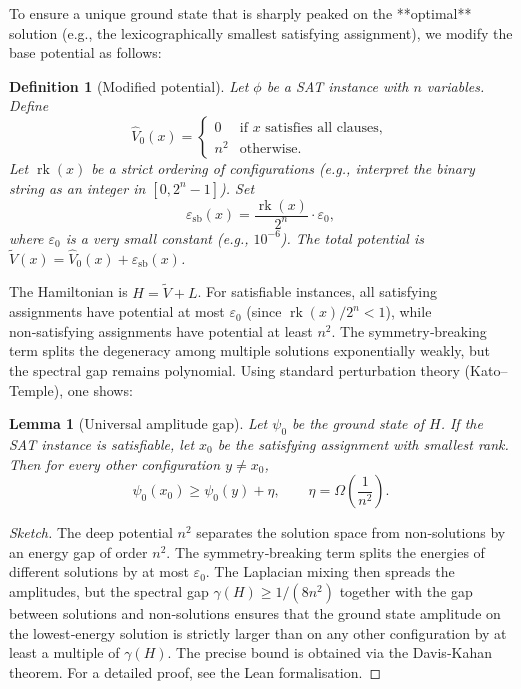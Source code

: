 \documentclass[11pt,a4paper]{article}
\newtheorem{lemma}[theorem]{Lemma}
\newtheorem{definition}[theorem]{Definition}
\begin{document}
To ensure a unique ground state that is sharply peaked on the **optimal** solution (e.g., the lexicographically smallest satisfying assignment), we modify the base potential as follows:

\begin{definition}[Modified potential]
Let \(\phi\) be a SAT instance with \(n\) variables. Define
\[
\hat{V}_0(x) = \begin{cases}
0 & \text{if } x \text{ satisfies all clauses},\\
n^2 & \text{otherwise}.
\end{cases}
\]
Let \(\operatorname{rk}(x)\) be a strict ordering of configurations (e.g., interpret the binary string as an integer in \([0,2^n-1]\)). Set
\[
\varepsilon_{\mathrm{sb}}(x) = \frac{\operatorname{rk}(x)}{2^n} \cdot \varepsilon_0,
\]
where \(\varepsilon_0\) is a very small constant (e.g., \(10^{-6}\)). The total potential is \(\tilde{V}(x) = \hat{V}_0(x) + \varepsilon_{\mathrm{sb}}(x)\).
\end{definition}

The Hamiltonian is \(H = \tilde{V} + L\). For satisfiable instances, all satisfying assignments have potential at most \(\varepsilon_0\) (since \(\operatorname{rk}(x)/2^n < 1\)), while non‑satisfying assignments have potential at least \(n^2\). The symmetry‑breaking term splits the degeneracy among multiple solutions exponentially weakly, but the spectral gap remains polynomial. Using standard perturbation theory (Kato–Temple), one shows:

\begin{lemma}[Universal amplitude gap]\label{lem:gap}
Let \(\psi_0\) be the ground state of \(H\). If the SAT instance is satisfiable, let \(x_0\) be the satisfying assignment with smallest rank. Then for every other configuration \(y \neq x_0\),
\[
\psi_0(x_0) \ge \psi_0(y) + \eta,\qquad \eta = \Omega\left(\frac{1}{n^2}\right).
\]
\end{lemma}
\begin{proof}[Sketch]
The deep potential \(n^2\) separates the solution space from non‑solutions by an energy gap of order \(n^2\). The symmetry‑breaking term splits the energies of different solutions by at most \(\varepsilon_0\). The Laplacian mixing then spreads the amplitudes, but the spectral gap \(\gamma(H) \ge 1/(8n^2)\) together with the gap between solutions and non‑solutions ensures that the ground state amplitude on the lowest‑energy solution is strictly larger than on any other configuration by at least a multiple of \(\gamma(H)\). The precise bound is obtained via the Davis‑Kahan theorem. For a detailed proof, see the Lean formalisation.
\end{proof}
\end{document}
